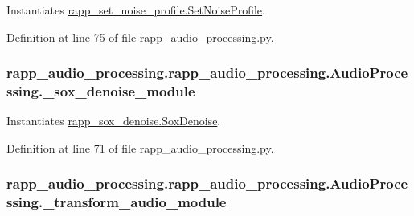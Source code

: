 Instantiates \hyperlink{classrapp__audio__processing_1_1rapp__set__noise__profile_1_1SetNoiseProfile}{rapp\-\_\-set\-\_\-noise\-\_\-profile.\-Set\-Noise\-Profile}. 



Definition at line 75 of file rapp\-\_\-audio\-\_\-processing.\-py.

\hypertarget{classrapp__audio__processing_1_1rapp__audio__processing_1_1AudioProcessing_a4a4e243504111ff3396a1fa9647d54ab}{
\subsubsection[{\-\_\-sox\-\_\-denoise\-\_\-module}]{\setlength{\rightskip}{0pt plus 5cm}rapp\-\_\-audio\-\_\-processing.\-rapp\-\_\-audio\-\_\-processing.\-Audio\-Processing.\-\_\-sox\-\_\-denoise\-\_\-module\hspace{0.3cm}{\ttfamily [private]}}}\label{classrapp__audio__processing_1_1rapp__audio__processing_1_1AudioProcessing_a4a4e243504111ff3396a1fa9647d54ab}


Instantiates \hyperlink{classrapp__audio__processing_1_1rapp__sox__denoise_1_1SoxDenoise}{rapp\-\_\-sox\-\_\-denoise.\-Sox\-Denoise}. 



Definition at line 71 of file rapp\-\_\-audio\-\_\-processing.\-py.

\hypertarget{classrapp__audio__processing_1_1rapp__audio__processing_1_1AudioProcessing_a4a55e532f2c513b4d6e888565aab5ff3}{
\subsubsection[{\-\_\-transform\-\_\-audio\-\_\-module}]{\setlength{\rightskip}{0pt plus 5cm}rapp\-\_\-audio\-\_\-processing.\-rapp\-\_\-audio\-\_\-processing.\-Audio\-Processing.\-\_\-transform\-\_\-audio\-\_\-module\hspace{0.3cm}{\ttfamily [private]}}}\label{classrapp__audio__processing_1_1rapp__audio__processing_1_1AudioProcessing_a4a55e532f2c513b4d6e888565aab5ff3}


